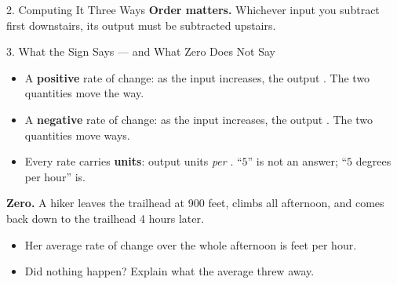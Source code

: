 \documentclass[10pt]{article}
\begin{document}
\begin{notesbox}{2. Computing It Three Ways}
\medskip
\textbf{Order matters.} Whichever input you subtract first downstairs, its
output must be subtracted  upstairs.
\end{notesbox}

\vspace{0.1in}

\boxguard[20]
\begin{notesbox}{3. What the Sign Says --- and What Zero Does Not Say}
\begin{itemize}[itemsep=4pt]
  \item A \textbf{positive} rate of change: as the input increases, the output
        . The two quantities move the  way.
  \item A \textbf{negative} rate of change: as the input increases, the output
        . The two quantities move  ways.
  \item Every rate carries \textbf{units}: output units \textit{per}
        . ``$5$'' is not an answer; ``$5$ degrees per hour'' is.
\end{itemize}

\medskip
\textbf{Zero.} A hiker leaves the trailhead at 900 feet, climbs all afternoon,
and comes back down to the trailhead 4 hours later.

\begin{itemize}[itemsep=4pt]
  \item Her average rate of change over the whole afternoon is
         feet per hour.
  \item Did nothing happen?  \; Explain what the average threw
        away.

        \vspace{0.05in}
\end{itemize}
\end{notesbox}

\vspace{0.1in}
\end{document}
